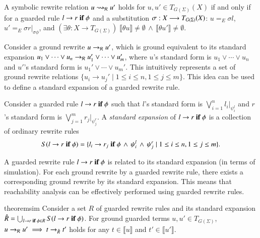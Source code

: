 \begin{definition}
\label{def:sym-guarded-rew}
A symbolic rewrite relation $u \rightsquigarrow_{\mathcal{R}} u'$ holds for $u, u' \in
T_{G(\Sigma)}(X)$ if and only if for a guarded rule
$l \rightarrow r\;\textnormal{\bf if}\; {\phi}$ and a substitution
$\sigma : X \longrightarrow T_{G(\Sigma)}(X)$: $u =_E \sigma l$, $u' =_E \sigma
r |_{\sigma \phi}$, and $(\exists \theta : X \to T_{G(\Sigma)})\;
\llbracket \theta u \rrbracket \neq \emptyset \,\wedge\, \llbracket
\theta u' \rrbracket \neq \emptyset$.
\end{definition}


Consider a ground rewrite $u \to_{\mathcal{R}} u'$, which is ground equivalent to
its standard expansion $u_1 \vee \cdots \vee u_n \to_{\mathcal{R}} u_1' \vee
\cdots \vee u_m'$, where $u$'s standard form is $u_1 \vee \cdots \vee
u_n$ and $u'$'s standard form is $u_1' \vee \cdots \vee u_m'$.  This
intuitively represents a set of ground rewrite relations $\{u_i \to
u_j' \mid 1 \leq i \leq n, 1 \leq j \leq m\}$.
%
This idea can be used to define a standard expansion of a guarded
rewrite rule.

\begin{definition}
Consider 
a guarded rule $l \rightarrow r\;\textnormal{\bf if}\; {\phi}$
such that $l$'s standard form is $\bigvee_{i=1}^n l_i |_{\psi_i^l}$ and 
$r$'s standard form is $\bigvee_{j=1}^m r_j |_{\psi_j^r}$.
%
A \emph{standard expansion} of $l \rightarrow r\;\textnormal{\bf if}\; {\phi}$
is
a collection of ordinary rewrite rules
\[
S(l \rightarrow r\;\textnormal{\bf if}\; {\phi}) = \{ l_i \rightarrow r_j\;\textnormal{\bf if}\; {\phi \,\wedge\, \psi_i^l \,\wedge\, \psi_j^r} \mid 1 \leq i \leq n, 1 \leq j \leq m\}.
\]
\end{definition}


A guarded rewrite rule $l \rightarrow r\;\textnormal{\bf if}\; {\phi}$ 
is related to  its standard expansion (in terms of simulation).
%
For each ground rewrite by a guarded rewrite rule, there exists a
corresponding ground rewrite by its standard expansion.  This means
that reachability analysis can be effectively performed using guarded
rewrite rules.

\begin{restatable}{theorem}{sim}
\label{thm:sim}
Consider a set $R$ of guarded rewrite rules and its standard expansion
$\hat{R} = \bigcup_{l \rightarrow r\;\textnormal{\bf if}\; {\phi} \in R} S(l \rightarrow r\;\textnormal{\bf if}\; {\phi})$.
For ground guarded terms $u, u' \in T_{G(\Sigma)}$, 
$u \to_{\mathcal{R}} u' \implies t \to_{\hat{R}} t'$ holds
for any %
$t \in \llbracket u \rrbracket$ and $t' \in \llbracket u' \rrbracket$.
\end{restatable}

